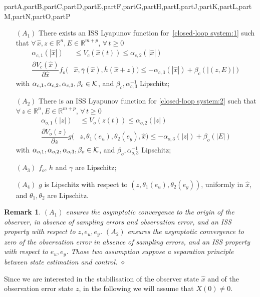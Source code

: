\documentclass[letterpaper, 10 pt, conference]{ieeeconf}
\def\compile{partA,partB,partC,partD,partE,partF,partG,partH,partI,partJ,partK,partL,partM,partN,partO,partP}
\newtheorem{rem}{Remark}
\def\skp{\vskip0pt}
\newenvironment{remark}{\skp\vspace{-\lastskip}\par\addvspace{.6pc plus .2pc minus .1pc}\begin{rem}}{\hfill$\diamond$\end{rem}\par\addvspace{.6pc plus .2pc minus .1pc}\skp}
\newcommand{\R}{\mathbb{R}}
\begin{document}
\begin{xcomment}{\compile}
\begin{partE}
\medskip
\begin{enumerate}
\item[$(A_1)$] There exists an ISS Lyapunov function for~\eqref{closed-loop system:1} such that $\forall\, \hat x,z\in\R^n,E \in\R^{m+p}$, $\forall\, t\ge0$
$$
\begin{aligned}
\alpha_{c,1}(|\hat x|)&\le V_c(\hat x(t))\le \alpha_{c,2}(|\hat x|) \\
\dfrac{\partial V_c(\hat x)}{\partial \hat x} f_o(&\hat x,\bar\gamma(\hat x),\bar h(\hat x+z))\le -\alpha_{c,3}(|\hat x|)+\beta_c(|(z,E)|)
\end{aligned}
$$ 
with $\alpha_{c,1},\alpha_{c,2},\alpha_{c,3},\beta_c\in{\cal K}$, and $\beta_c,\alpha_{c,3}^{-1}$ Lipschitz;


\item[$(A_2)$] There is an ISS Lyapunov function for \eqref{closed-loop system:2} such that $\forall\,z \in\R^n,E \in\R^{m+p}$, $\forall\, t\ge0$
$$
\begin{aligned}
\alpha_{o,1}(|z|)&\le V_o(z(t))\le \alpha_{o,2}(|z|)   \\
\dfrac{\partial V_o(z)}{\partial z}g(&z,\theta_1(e_u),\theta_2(e_y),\hat x)\le -\alpha_{o,3}(|z|) +\beta_o(|E|)
\end{aligned}
$$
with $\alpha_{o,1},\alpha_{o,2},\alpha_{o,3},\beta_o\in{\cal K}$, and $\beta_o,\alpha_{o,3}^{-1}$ Lipschitz;


\item[$(A_3)$] $f_o$, $h$ and $\gamma$ are Lipschitz;


\item[$(A_4)$] $g$ is Lipschitz with respect to $(z,\theta_1(e_u),\theta_2(e_y))$, uniformly in $\hat x$, and $\theta_1,\theta_2$ are Lipschitz.
\end{enumerate}

\medskip
\begin{remark}
$(A_1)$ ensures the asymptotic convergence to the origin of the observer, in absence of sampling errors and observation error, and an ISS property with respect to $z,e_u,e_y$. $(A_2)$ ensures the asymptotic convergence to zero of the observation error in absence of sampling errors, and an ISS property with respect to $e_u,e_y$.
Those two assumption suppose a separation principle between state estimation and control.
\end{remark}
\medskip



Since we are interested in the stabilisation of the observer state $\hat x$ and of the observation error state $z$, in the following we will assume that $X(0)\ne 0$.



\end{partE}
\end{xcomment}
\end{document}
